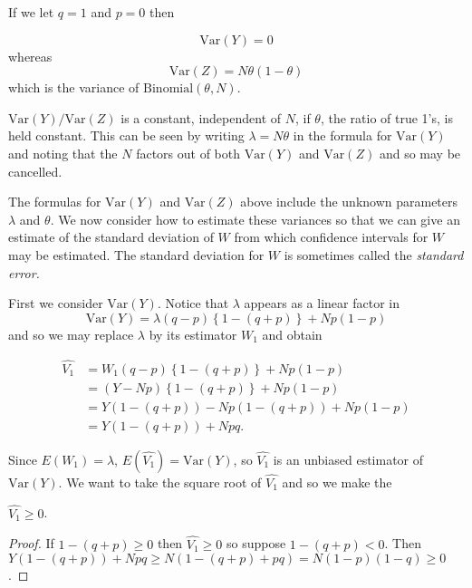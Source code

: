\documentclass[oneside,12pt]{amsart}
\begin{document}
\begin{remark}
If we let $q = 1$ and $p = 0$ then

$$\text{Var}(Y) = 0$$
whereas
$$\text{Var}(Z) = N \theta (1 - \theta)$$
which is the variance of $\text{Binomial}(\theta, N)$.

\end{remark}

\begin{remark}
$\text{Var}(Y)/\text{Var}(Z)$ is a constant, independent of $N$, if $\theta$,
the ratio of true 1's, is held constant.
This can be seen by writing $\lambda = N \theta$ in the formula for
$\text{Var}(Y)$ and noting that the $N$ factors out of both $\text{Var}(Y)$ and
$\text{Var}(Z)$ and so may be cancelled.
\end{remark}

The formulas for $\text{Var}(Y)$ and $\text{Var}(Z)$ above include the unknown
parameters $\lambda$ and $\theta$. We now consider how to estimate these variances so
that we can give an estimate of the standard deviation of $W$ from which
confidence intervals for $W$ may be estimated. The standard deviation for
$W$ is sometimes called the \emph{standard error.}

First we consider $\text{Var}(Y)$. Notice that $\lambda$ appears as a linear
factor in
$$\text{Var}(Y)  = \lambda (q-p) \left \{ 1-(q+p) \right \} + N p (1 - p)$$
and so we may replace $\lambda$ by its estimator $W_1$ and obtain

\begin{equation}
\begin{split}
\hat{V_1} & =  W_1  (q-p) \left \{ 1-(q+p) \right \} + N p (1 - p) \\
 & =  (Y - N p)  \left \{ 1-(q+p) \right \} + N p (1 - p) \\
 & =  Y (1 - (q+p)) - Np(1 - (q+p)) + Np(1-p) \\
 & =  Y (1 - (q+p)) + Npq.
\end{split}
\end{equation}

Since $E(W_1) = \lambda$, $E(\hat{V_1}) = \text{Var}(Y)$, so $\hat{V_1}$ is an
unbiased estimator of $\text{Var}(Y)$. We want to take the square root of $\hat{V_1}$
and so we make the

\begin{claim}
$\hat{V_1}\geq 0$.
\end{claim}
\begin{proof}
If $1 - (q+p) \geq 0$ then $\hat{V_1}\geq 0$ so suppose $1 - (q+p) < 0$.
Then $Y (1 - (q+p)) + Npq \geq N(1 - (q+p) + pq) = N(1 - p)(1 - q) \geq 0$.
\end{proof}
\end{document}
